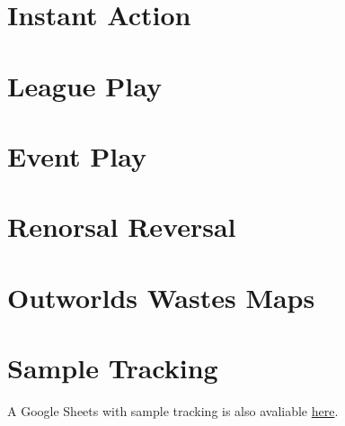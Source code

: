 \documentclass{article}
\newcommand{\mysectiontitle}{}
\newcommand{\newsection}[2]{\renewcommand{\mysectiontitle}{#2}\section{#1}}
\begin{document}


\newpage

\newsection{Instant Action}{instant-action}



\newpage

\newsection{League Play}{league-play}
\label{sec:league_play}



\newpage

\newsection{Event Play}{event-play}
\label{sec:event_play}



\newpage

\newsection{Renorsal Reversal}{short-story}



\newpage

\newsection{Outworlds Wastes Maps}{outworlds-wastes-map}
\label{sec:outworlds_wastes_map}





\newpage

\newsection{Sample Tracking}{sample-tracking}
\label{sec:sample_tracking}

A Google Sheets with sample tracking is also avaliable \href{https://docs.google.com/spreadsheets/d/1uGSthgyHZNMcxrVl6FJjIguesnTC9MTuP-9ow939Quw/copy}{here}.
\end{document}
